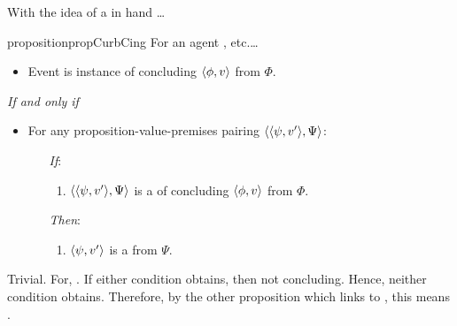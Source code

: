 \begin{note}
  With the idea of a \curb{} in hand \dots

  \begin{restatable}{proposition}{propCurbCing}
    \label{prop:sCing}
    For an agent \vAgent{}, etc.\dots

    \begin{itemize}
    \item
      Event is instance of concluding \(\langle \phi, v \rangle\) from \(\Phi\).
    \end{itemize}

    \emph{If and only if}

    \begin{itemize}
    \item
      For any proposition-value-premises pairing \(\langle \langle \psi, v' \rangle, \Psi \rangle\):
      \begin{itemize}
      \item[\emph{If}:]
        \begin{enumerate}[label=\alph*., ref=(\alph*)]
        \item
          \label{question:zs:option}
          \(\langle \langle \psi, v' \rangle, \Psi \rangle\) is a \curb{} of concluding \(\langle \phi, v \rangle\) from \(\Phi\).
        \end{enumerate}
      \item[\emph{Then}:]
        \begin{enumerate}[label=\alph*., ref=(\alph*), resume]
        \item
          \label{question:zs:may-fail}
          \(\langle \psi, v' \rangle\) is a \fc{} from \(\Psi\).
        \end{enumerate}
      \end{itemize}
    \end{itemize}
    \begin{argument}
      Trivial.
      For, \curb{}.
      If either condition obtains, then not concluding.
      Hence, neither condition obtains.
      Therefore, by the other proposition which links to \fc{}, this means \fc{}.
    \end{argument}
  \end{restatable}
\end{note}

